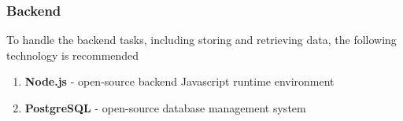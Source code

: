 \subsubsection{Backend}
To handle the backend tasks, including storing and retrieving data, the following technology is recommended

\begin{enumerate}
    \item \textbf{Node.js} - open-source backend Javascript runtime environment
    \item \textbf{PostgreSQL} - open-source database management system
\end{enumerate}
